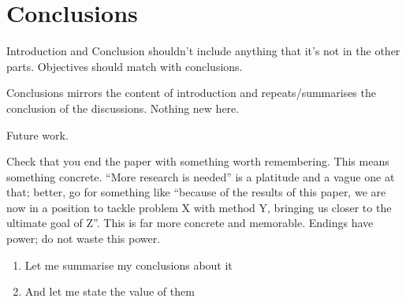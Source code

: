 \chapter{Conclusions} \label{Chapter: Conclusions}

Introduction and Conclusion shouldn't include anything that it's not in the other parts.
Objectives should match with conclusions.

Conclusions mirrors the content of introduction and repeats/summarises the conclusion of the discussions. Nothing new here.

Future work.

Check that you end the paper with something worth remembering. This means something concrete. “More research is needed” is a platitude and a vague one at that; better, go for something like “because of the results of this paper, we are now in a position to tackle problem X with method Y, bringing us closer to the ultimate goal of Z”. This is far more concrete and memorable. Endings have power; do not waste this power.

\begin{enumerate}
\item Let me summarise my conclusions about it
\item And let me state the value of them
\end{enumerate}

